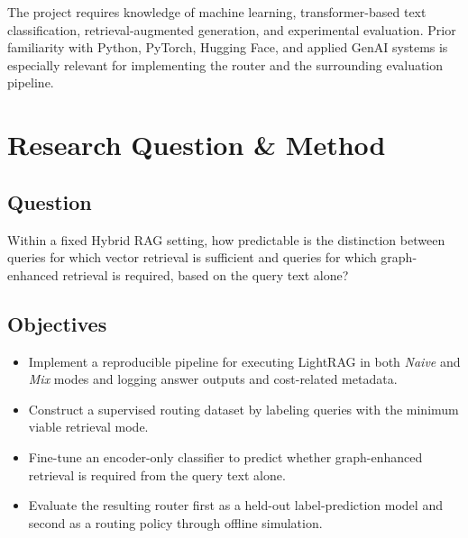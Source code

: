 \documentclass[11pt, a4paper]{article}
\begin{document}
The project requires knowledge of machine learning, transformer-based text classification, retrieval-augmented generation, and experimental evaluation. Prior familiarity with Python, PyTorch, Hugging Face, and applied GenAI systems is especially relevant for implementing the router and the surrounding evaluation pipeline.

\section{Research Question \& Method}

\subsection{Question} Within a fixed Hybrid RAG setting, how predictable is the distinction between queries for which vector retrieval is sufficient and queries for which graph-enhanced retrieval is required, based on the query text alone?

\subsection{Objectives}
\begin{itemize}[label=--]
    \item Implement a reproducible pipeline for executing LightRAG in both \emph{Naive} and \emph{Mix} modes and logging answer outputs and cost-related metadata.
    \item Construct a supervised routing dataset by labeling queries with the minimum viable retrieval mode.
    \item Fine-tune an encoder-only classifier to predict whether graph-enhanced retrieval is required from the query text alone.
    \item Evaluate the resulting router first as a held-out label-prediction model and second as a routing policy through offline simulation.
\end{itemize}
\end{document}
